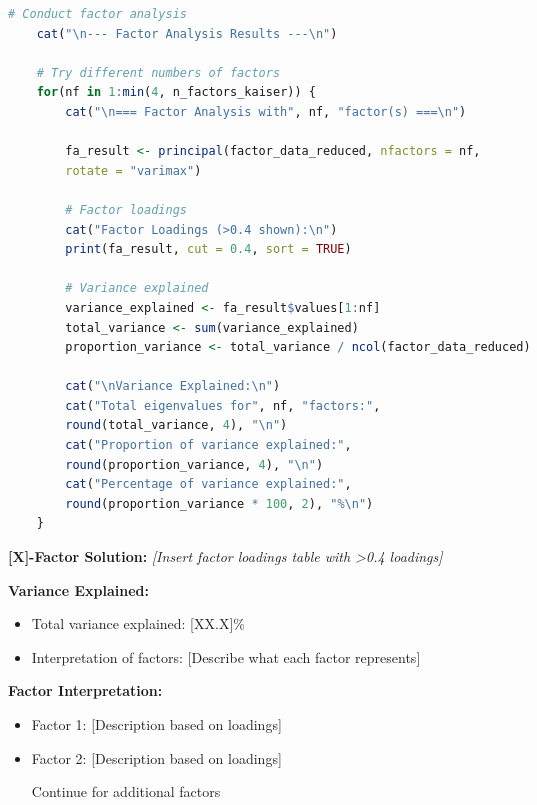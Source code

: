 \begin{lstlisting}[language=R, caption=Factor Analysis Implementation, breaklines=true]
	# Conduct factor analysis
	cat("\n--- Factor Analysis Results ---\n")
	
	# Try different numbers of factors
	for(nf in 1:min(4, n_factors_kaiser)) {
		cat("\n=== Factor Analysis with", nf, "factor(s) ===\n")
		
		fa_result <- principal(factor_data_reduced, nfactors = nf, 
		rotate = "varimax")
		
		# Factor loadings
		cat("Factor Loadings (>0.4 shown):\n")
		print(fa_result, cut = 0.4, sort = TRUE)
		
		# Variance explained
		variance_explained <- fa_result$values[1:nf]
		total_variance <- sum(variance_explained)
		proportion_variance <- total_variance / ncol(factor_data_reduced)
		
		cat("\nVariance Explained:\n")
		cat("Total eigenvalues for", nf, "factors:", 
		round(total_variance, 4), "\n")
		cat("Proportion of variance explained:", 
		round(proportion_variance, 4), "\n")
		cat("Percentage of variance explained:", 
		round(proportion_variance * 100, 2), "%\n")
	}
\end{lstlisting}

\textbf{[X]-Factor Solution:}
\textit{[Insert factor loadings table with >0.4 loadings]}

\textbf{Variance Explained:}
\begin{itemize}
	\item Total variance explained: [XX.X]\%
	\item Interpretation of factors: [Describe what each factor represents]
\end{itemize}

\textbf{Factor Interpretation:}
\begin{itemize}
	\item Factor 1: [Description based on loadings]
	\item Factor 2: [Description based on loadings]
	\item [Continue for additional factors]
\end{itemize}
